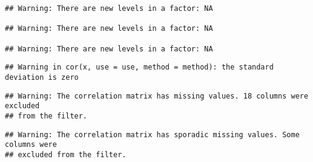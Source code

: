 \documentclass[
]{article}
\begin{document}
\begin{verbatim}
## Warning: There are new levels in a factor: NA

## Warning: There are new levels in a factor: NA

## Warning: There are new levels in a factor: NA
\end{verbatim}

\begin{verbatim}
## Warning in cor(x, use = use, method = method): the standard deviation is zero
\end{verbatim}

\begin{verbatim}
## Warning: The correlation matrix has missing values. 18 columns were excluded
## from the filter.
\end{verbatim}

\begin{verbatim}
## Warning: The correlation matrix has sporadic missing values. Some columns were
## excluded from the filter.
\end{verbatim}
\end{document}
